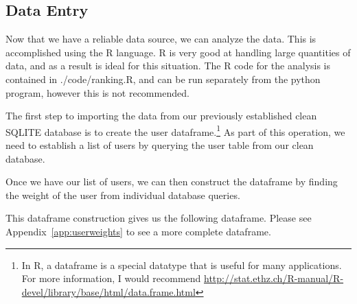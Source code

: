     \subsection{Data Entry}
    Now that we have a reliable data source, we can analyze the data. This is accomplished using the R language. R is very good at handling large quantities of data, and as a result is ideal for this situation. The R code for the analysis is contained in {\ttfamily ./code/ranking.R}, and can be run separately from the python program, however this is not recommended.

    The first step to importing the data from our previously established clean SQLITE database is to create the user dataframe.\footnote{In R, a dataframe is a special datatype that is useful for many applications. For more information, I would recommend \url{http://stat.ethz.ch/R-manual/R-devel/library/base/html/data.frame.html}} As part of this operation, we need to establish a list of users by querying the user table from our clean database.


    Once we have our list of users, we can then construct the dataframe by finding the weight of the user from individual database queries.


    This dataframe construction gives us the following dataframe. Please see Appendix~\ref{app:userweights}  to see a more complete dataframe.

